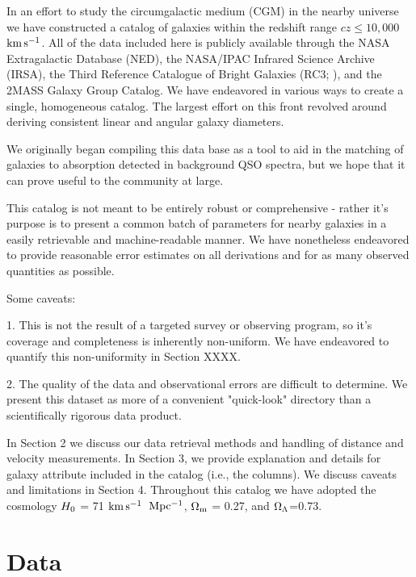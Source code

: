 \documentclass[iop]{emulateapj-rtx4}
\newcommand{\kms}{$\rm km\, s^{-1}$}
\begin{document}

In an effort to study the circumgalactic medium (CGM) in the nearby universe we have constructed a catalog of galaxies within the redshift range $cz \leq 10,000$ \kms. All of the data included here is publicly available through the NASA Extragalactic Database (NED), the NASA/IPAC Infrared Science Archive (IRSA), the Third Reference Catalogue of Bright Galaxies (RC3; \cite{RC3}), and the \cite{tully2015} 2MASS Galaxy Group Catalog. We have endeavored in various ways to create a single, homogeneous catalog. The largest effort on this front revolved around deriving consistent linear and angular galaxy diameters. 


We originally began compiling this data base as a tool to aid in the matching of galaxies to absorption detected in background QSO spectra, but we hope that it can prove useful to the community at large.

This catalog is not meant to be entirely robust or comprehensive - rather it's purpose is to present a common batch of parameters for nearby galaxies in a easily retrievable and machine-readable manner. We have nonetheless endeavored to provide reasonable error estimates on all derivations and for as many observed quantities as possible.


Some caveats:

1. This is not the result of a targeted survey or observing program, so it's coverage and completeness is inherently non-uniform. We have endeavored to quantify this non-uniformity in Section XXXX.

2. The quality of the data and observational errors are difficult to determine. We present this dataset as more of a convenient "quick-look" directory than a scientifically rigorous data product.


%
%

In Section 2 we discuss our data retrieval methods and handling of distance and velocity measurements. In Section 3, we provide explanation and details for galaxy attribute included in the catalog (i.e., the columns). We discuss caveats and limitations in Section 4. Throughout this catalog we have adopted the cosmology $H_{\rm 0}$ = 71 \kms ~$\rm Mpc^{-1}$, $\rm \Omega_m$ = 0.27, and $\rm \Omega_{\Lambda}$=0.73.

\section{Data}
\end{document}
